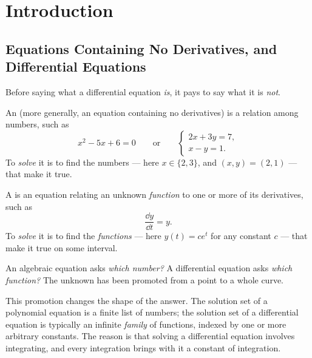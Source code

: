 \chapter{Introduction}

\section{Equations Containing No Derivatives, and Differential Equations}


Before saying what a differential equation \emph{is}, it pays to say what it is
\emph{not}.

\begin{definition}
	An  (more generally, an equation containing no
	derivatives) is a relation among numbers, such as
	\[
		x^2 - 5x + 6 = 0
		\qquad\text{or}\qquad
		\begin{cases}
			2x + 3y = 7, \\
			x - y = 1.
		\end{cases}
	\]
	To \emph{solve} it is to find the numbers --- here \(x \in \{2,3\}\), and
	\((x,y) = (2,1)\) --- that make it true.
\end{definition}

\begin{definition}
	A  is an equation relating an unknown
	\emph{function} to one or more of its derivatives, such as
	\[
		\frac{\dd y}{\dd t} = y.
	\]
	To \emph{solve} it is to find the \emph{functions} --- here
	\(y(t) = ce^{t}\) for any constant \(c\) --- that make it true on some interval.
\end{definition}

\begin{moral}
	An algebraic equation asks \emph{which number?} A differential equation asks
	\emph{which function?} The unknown has been promoted from a point to a whole curve.
\end{moral}

\begin{observation}
	This promotion changes the shape of the answer. The solution set of a polynomial
	equation is a finite list of numbers; the solution set of a differential equation is
	typically an infinite \emph{family} of functions, indexed by one or more arbitrary
	constants. The reason is that solving a differential equation involves integrating,
	and every integration brings with it a constant of integration.
\end{observation}

